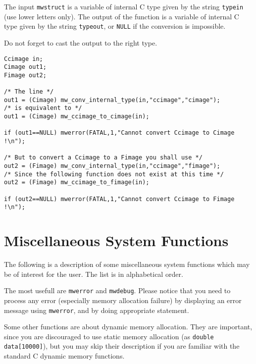 The input \verb+mwstruct+ is a variable of internal C type given by the
string \verb+typein+ (use lower letters only). 
The output of the function is a variable of internal C type given by the 
string \verb+typeout+, or \verb+NULL+ if the conversion is impossible.

Do not forget to cast the output to the right type.

\Next
\Example
\begin{verbatim}
Ccimage in;  
Cimage out1;
Fimage out2;

/* The line */
out1 = (Cimage) mw_conv_internal_type(in,"ccimage","cimage");
/* is equivalent to */
out1 = (Cimage) mw_ccimage_to_cimage(in);

if (out1==NULL) mwerror(FATAL,1,"Cannot convert Ccimage to Cimage !\n");

/* But to convert a Ccimage to a Fimage you shall use */
out2 = (Fimage) mw_conv_internal_type(in,"ccimage","fimage");
/* Since the following function does not exist at this time */
out2 = (Fimage) mw_ccimage_to_fimage(in);

if (out2==NULL) mwerror(FATAL,1,"Cannot convert Ccimage to Fimage !\n");

\end{verbatim}

\newpage %


\section{Miscellaneous System Functions}

\label{misc_function}

The following is a description of some miscellaneous system functions 
which may be of interest for the user.
The list is in alphabetical order.

The most usefull are \verb+mwerror+ and \verb+mwdebug+. 
Please notice that you need to process any error (especially memory allocation failure) by displaying an error message using \verb+mwerror+, and by doing
appropriate statement.

Some other functions are about dynamic memory allocation. 
They are important, since you are discouraged to use static memory allocation (as \verb+double data[10000]+), but you may skip their description if you are
familiar with the standard C dynamic memory functions.

\newpage %


